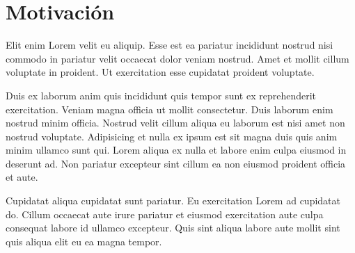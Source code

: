 \section{Motivación}\label{sec:motivacion}
Elit enim Lorem velit eu aliquip. Esse est ea pariatur incididunt nostrud nisi commodo in pariatur velit occaecat dolor veniam nostrud. Amet et mollit cillum voluptate in proident. Ut exercitation esse cupidatat proident voluptate.

Duis ex laborum anim quis incididunt quis tempor sunt ex reprehenderit exercitation. Veniam magna officia ut mollit consectetur. Duis laborum enim nostrud minim officia. Nostrud velit cillum aliqua eu laborum est nisi amet non nostrud voluptate. Adipisicing et nulla ex ipsum est sit magna duis quis anim minim ullamco sunt qui. Lorem aliqua ex nulla et labore enim culpa eiusmod in deserunt ad. Non pariatur excepteur sint cillum ea non eiusmod proident officia et aute.

Cupidatat aliqua cupidatat sunt pariatur. Eu exercitation Lorem ad cupidatat do. Cillum occaecat aute irure pariatur et eiusmod exercitation aute culpa consequat labore id ullamco excepteur. Quis sint aliqua labore aute mollit sint quis aliqua elit eu ea magna tempor.
